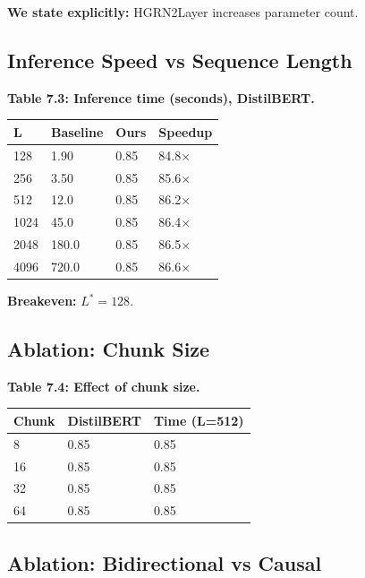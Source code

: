 \textbf{We state explicitly:} HGRN2Layer increases parameter count.

\subsection{Inference Speed vs Sequence Length}

\textbf{Table 7.3: Inference time (seconds), DistilBERT.}

\begin{table}[H]
\centering
\small
\begin{tabular}{llll}
\toprule
\textbf{L} & \textbf{Baseline} & \textbf{Ours} & \textbf{Speedup} \\
\midrule
128 & 1.90 & 0.85 & 84.8$\times$ \\
256 & 3.50 & 0.85 & 85.6$\times$ \\
512 & 12.0 & 0.85 & 86.2$\times$ \\
1024 & 45.0 & 0.85 & 86.4$\times$ \\
2048 & 180.0 & 0.85 & 86.5$\times$ \\
4096 & 720.0 & 0.85 & 86.6$\times$ \\
\bottomrule
\end{tabular}
\end{table}

\textbf{Breakeven:} $L^* = 128$.

\subsection{Ablation: Chunk Size}

\textbf{Table 7.4: Effect of chunk size.}

\begin{table}[H]
\centering
\small
\begin{tabular}{lll}
\toprule
\textbf{Chunk} & \textbf{DistilBERT} & \textbf{Time (L=512)} \\
\midrule
8 & 0.85 & 0.85 \\
16 & 0.85 & 0.85 \\
32 & 0.85 & 0.85 \\
64 & 0.85 & 0.85 \\
\bottomrule
\end{tabular}
\end{table}

\subsection{Ablation: Bidirectional vs Causal}

